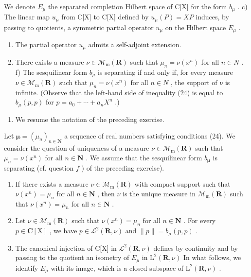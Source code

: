 We denote \(E_{\mu}\) the separated completion Hilbert space of C{[}X{]} for the form \(b_{\mu}\) . c) The linear map \(u_{\mu}\) from C{[}X{]} to C{[}X{]} defined by \(u_{\mu}(P) = XP\) induces, by passing to quotients, a symmetric partial operator \(u_{\mu}\) on the Hilbert space \(E_{\mu}\) .

\begin{enumerate}
\def\labelenumi{\alph{enumi})}
\setcounter{enumi}{3}
\item
  The partial operator \(u_{\mu}\) admits a self-adjoint extension.
\item
  There exists a measure \(\nu\in\mathcal{M}_{\mathrm{m}}(\mathbf{R})\) such that \(\mu_{n}=\nu(x^{n})\) for all \(n\in N\) . f) The sesquilinear form \(b_{\mu}\) is separating if and only if, for every measure \(\nu\in\mathcal{M}_{\mathrm{m}}(\mathbf{R})\) such that \(\mu_{n}=\nu(x^{n})\) for all \(n\in N\) , the support of \(\nu\) is infinite. (Observe that the left-hand side of inequality (24) is equal to \(b_{\mu}(p,p)\) for \(p=a_{0}+\cdots+a_{n}X^{n}\) .)
\end{enumerate}

\begin{enumerate}
\def\labelenumi{\arabic{enumi})}
\setcounter{enumi}{21}
\tightlist
\item
  We resume the notation of the preceding exercise.
\end{enumerate}

Let \(\boldsymbol{\mu} = (\mu_n)_{n\in \mathbf{N}}\) a sequence of real numbers satisfying conditions (24). We consider the question of uniqueness of a measure \(\nu \in \mathcal{M}_{\mathrm{m}}(\mathbf{R})\) such that \(\mu_{n} = \nu (x^{n})\) for all \(n\in \mathbf{N}\) . We assume that the sesquilinear form \(b_{\boldsymbol{\mu}}\) is separating (cf. question \(f\) ) of the preceding exercise).

\begin{enumerate}
\def\labelenumi{\alph{enumi})}
\item
  If there exists a measure \(\nu \in \mathcal{M}_{\mathrm{m}}(\mathbf{R})\) with compact support such that \(\nu(x^{n}) = \mu_{n}\) for all \(n \in \mathbf{N}\) , then \(\nu\) is the unique measure in \(\mathcal{M}_{\mathrm{m}}(\mathbf{R})\) such that \(\nu(x^{n}) = \mu_{n}\) for all \(n \in \mathbf{N}\) .
\item
  Let \(\nu \in \mathcal{M}_{\mathrm{m}}(\mathbf{R})\) such that \(\nu (x^n) = \mu_n\) for all \(n\in \mathbf{N}\) . For every \(p\in \mathbf{C}[\mathrm{X}]\) , we have \(p\in \mathcal{L}^2 (\mathbf{R},\nu)\) and \(\| p\| = b_{\mu}(p,p)\) .
\item
  The canonical injection of C{[}X{]} in \(\mathcal{L}^{2}(\mathbf{R},\nu)\) defines by continuity and by passing to the quotient an isometry of \(E_{\mu}\) in \(\mathrm{L}^{2}(\mathbf{R},\nu)\) In what follows, we identify \(E_{\mu}\) with its image, which is a closed subspace of \(\mathrm{L}^{2}(\mathbf{R},\nu)\) .
\end{enumerate}

